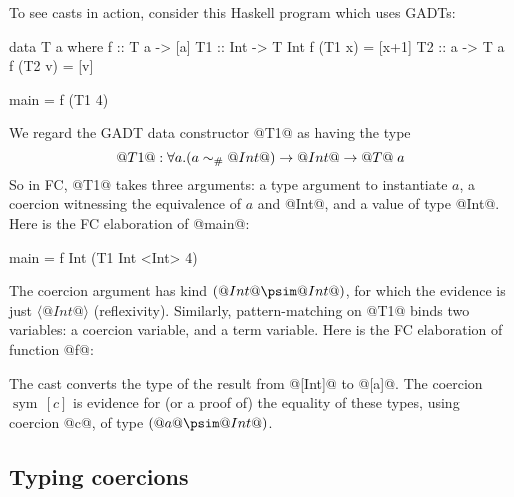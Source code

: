 \documentclass[a4paper,UKenglish]{lipics}
\newcommand{\psim}{\mathrel{\sim_{\tiny \#}}}
\newcommand{\sym}[1]{\mathop{sym}\, #1}
\newcommand{\refl}[1]{\langle#1\rangle}  %
\begin{document}
To see casts in action, consider this Haskell program which uses GADTs:
\begin{code}
  data T a where               f :: T a -> [a]   
     T1 :: Int -> T Int        f (T1 x) = [x+1]  
     T2 :: a -> T a            f (T2 v) = [v]    

                               main = f (T1 4)   
\end{code}
We regard the GADT data constructor @T1@ as having the type
$$ @T1@ : \forall a. (a \psim @Int@) \to @Int@ \to @T@\;a $$
So in FC, @T1@ takes three arguments: a type argument to instantiate $a$,
a coercion witnessing the equivalence of $a$ and @Int@, and a value of type @Int@.
Here is the FC elaboration of @main@:
\begin{code}
  main = f Int (T1 Int <Int> 4)
\end{code}
The coercion argument has kind $(@Int@\psim@Int@)$, for which the evidence
is just $\refl{@Int@}$ (reflexivity).
Similarly, pattern-matching on @T1@ binds two variables: 
a coercion variable, and a term variable.  Here is the FC elaboration 
of function @f@:
The cast converts the type of the result from @[Int]@ to @[a]@.
The coercion $\sym{[c]}$ is evidence for (or a proof of) 
the equality of these types, using coercion @c@, of type $(@a@\psim@Int@)$.

\subsection{Typing coercions} \label{sec:newtype} \label{sec:type-funs}
\end{document}
